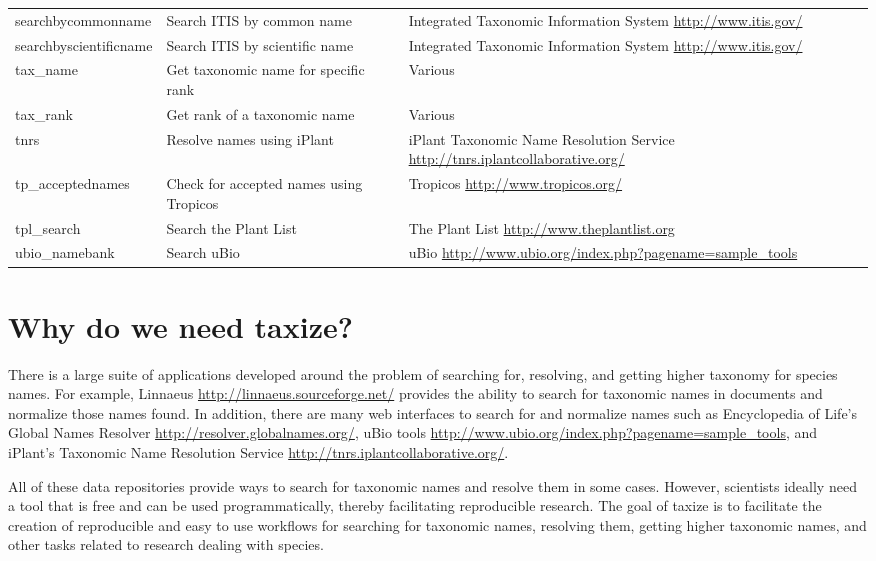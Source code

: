 \documentclass[10pt,a4paper,twocolumn]{article}\usepackage[]{graphicx}\usepackage[]{color}
\begin{document}
\begin{table*}[!ht]
\begin{tabular}{|l|L|L|}
searchbycommonname & Search ITIS by common name & Integrated Taxonomic Information System \url{http://www.itis.gov/}  \\
searchbyscientificname & Search ITIS by scientific name & Integrated Taxonomic Information System \url{http://www.itis.gov/}  \\
tax\_name & Get taxonomic name for specific rank & Various  \\
tax\_rank & Get rank of a taxonomic name & Various  \\
tnrs & Resolve names using iPlant & iPlant Taxonomic Name Resolution Service \url{http://tnrs.iplantcollaborative.org/}  \\
tp\_acceptednames & Check for accepted names using Tropicos & Tropicos \url{http://www.tropicos.org/}  \\
tpl\_search & Search the Plant List & The Plant List \url{http://www.theplantlist.org}  \\
ubio\_namebank & Search uBio & uBio \url{http://www.ubio.org/index.php?pagename=sample_tools}  \\
\hline
\end{tabular}
\label{tab:a}
\end{table*}


\section*{Why do we need taxize?}

There is a large suite of applications developed around the problem of searching for, resolving, and getting higher taxonomy for species names. For example, Linnaeus \url{http://linnaeus.sourceforge.net/} provides the ability to search for taxonomic names in documents and normalize those names found. In addition, there are many web interfaces to search for and normalize names such as Encyclopedia of Life's Global Names Resolver \url{http://resolver.globalnames.org/}, uBio tools \url{http://www.ubio.org/index.php?pagename=sample_tools}, and iPlant's Taxonomic Name Resolution Service \url{http://tnrs.iplantcollaborative.org/}. 

All of these data repositories provide ways to search for taxonomic names and resolve them in some cases. However, scientists ideally need a tool that is free and can be used programmatically, thereby facilitating reproducible research. The goal of taxize is to facilitate the creation of reproducible and easy to use workflows for searching for taxonomic names, resolving them, getting higher taxonomic names, and other tasks related to research dealing with species.
 
\end{document}
